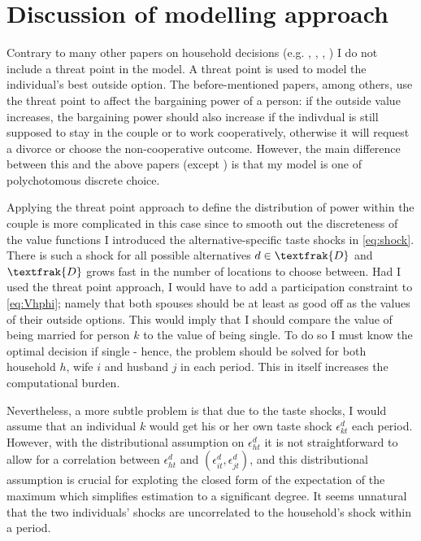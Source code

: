 \section{Discussion of modelling approach}\label{sec:modeldisc}
Contrary to many other papers on household decisions (e.g. \cite{Voena2015}, \cite{DelbocaFlinn2012}, \cite{Gemici2011}, \cite{LundbergPollak1993}) I do not include a threat point in the model. A threat point is used to model the individual's best outside option. The before-mentioned papers, among others, use the threat point to affect the bargaining power of a person: if the outside value increases, the bargaining power should also increase if the indivdual is still supposed to stay in the couple or to work cooperatively, otherwise it will request a divorce or choose the non-cooperative outcome. However, the main difference between this and the above papers (except \cite{Gemici2011}) is that my model is one of polychotomous discrete choice. 

Applying the threat point approach to define the distribution of power within the couple is more complicated in this case since to smooth out the discreteness of the value functions I introduced the alternative-specific taste shocks in \eqref{eq:shock}. There is such a shock for all possible alternatives $d \in \textfrak{D}$ and $\textfrak{D}$ grows fast in the number of locations to choose between. Had I used the threat point approach, I would have to add a participation constraint to \eqref{eq:Vhphi}; namely that both spouses should be at least as good off as the values of their outside options. This would imply that I should compare the value of being married for person $k$ to the value of being single. To do so I must know the optimal decision if single - hence, the problem should be solved for both household $h$, wife $i$ and husband $j$ in each period. This in itself increases the computational burden. 

Nevertheless, a more subtle problem is that due to the taste shocks, I would assume that an individual $k$ would get his or her own taste shock $\epsilon_{kt}^d$ each period. However, with the distributional assumption on $\epsilon_{ht}^d$ it is not straightforward to allow for a correlation between $\epsilon_{ht}^d$ and $(\epsilon_{it}^d,\epsilon_{jt}^d)$, and this distributional assumption is crucial for exploting the closed form of the expectation of the maximum which simplifies estimation to a significant degree. It seems unnatural that the two individuals' shocks are uncorrelated to the household's shock within a period. 

